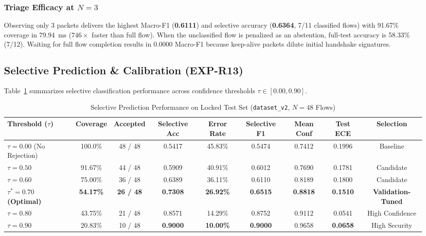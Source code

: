 \documentclass[conference]{IEEEtran}
\begin{document}
\subsubsection{Triage Efficacy at $N=3$}
Observing only 3 packets delivers the highest Macro-F1 (\textbf{0.6111}) and selective accuracy (\textbf{0.6364}, 7/11 classified flows) with 91.67\% coverage in 79.94~ms ($746\times$ faster than full flow). When the unclassified flow is penalized as an abstention, full-test accuracy is 58.33\% (7/12). Waiting for full flow completion results in 0.0000 Macro-F1 because keep-alive packets dilute initial handshake signatures.

\subsection{Selective Prediction \& Calibration (EXP-R13)}
Table~\ref{tab:selective_prediction} summarizes selective classification performance across confidence thresholds $\tau \in [0.00, 0.90]$.

\begin{table}[t]
\centering
\caption{Selective Prediction Performance on Locked Test Set (\texttt{dataset\_v2}, $N=48$ Flows)}
\label{tab:selective_prediction}
\footnotesize
\begin{tabularx}{\textwidth}{lcccccccc}
\toprule
\textbf{Threshold ($\tau$)} & \textbf{Coverage} & \textbf{Accepted} & \textbf{Selective Acc} & \textbf{Error Rate} & \textbf{Selective F1} & \textbf{Mean Conf} & \textbf{Test ECE} & \textbf{Selection} \\
\midrule
$\tau = 0.00$ (No Rejection) & 100.0\% & 48 / 48 & 0.5417 & 45.83\% & 0.5474 & 0.7412 & 0.1996 & Baseline \\
$\tau = 0.50$ & 91.67\% & 44 / 48 & 0.5909 & 40.91\% & 0.6012 & 0.7690 & 0.1781 & Candidate \\
$\tau = 0.60$ & 75.00\% & 36 / 48 & 0.6389 & 36.11\% & 0.6110 & 0.8189 & 0.1800 & Candidate \\
\textbf{$\tau^* = 0.70$ (Optimal)} & \textbf{54.17\%} & \textbf{26 / 48} & \textbf{0.7308} & \textbf{26.92\%} & \textbf{0.6515} & \textbf{0.8818} & \textbf{0.1510} & \textbf{Validation-Tuned} \\
$\tau = 0.80$ & 43.75\% & 21 / 48 & 0.8571 & 14.29\% & 0.8752 & 0.9112 & 0.0541 & High Confidence \\
$\tau = 0.90$ & 20.83\% & 10 / 48 & \textbf{0.9000} & \textbf{10.00\%} & \textbf{0.9000} & 0.9658 & \textbf{0.0658} & High Security \\
\bottomrule
\end{tabularx}
\end{table}
\end{document}
